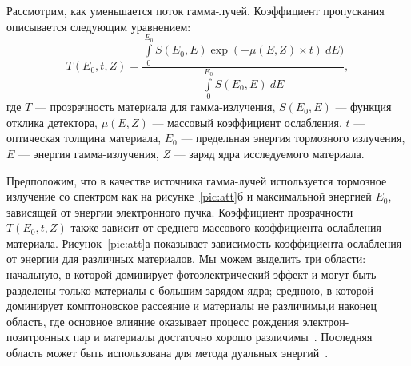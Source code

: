 \documentclass[a4paper]{panl}
\begin{document}
Рассмотрим, как уменьшается поток гамма-лучей. Коэффициент пропускания описывается следующим уравнением:
\begin{equation}
\label{eq:trans}
T(E_0, t, Z) = \frac{\int \limits_0^{E_0} S(E_0, E) \exp(-\mu(E,Z)\times t)~dE)}{\int \limits_0^{E_0} S(E_0, E)~dE},
\end{equation}
где $T$ --- прозрачность материала для гамма-излучения, $S(E_0, E)$ --- функция отклика детектора, $\mu(E,Z)$ --- массовый коэффициент ослабления, $t$ ---  оптическая толщина материала, $E_0$ --- предельная энергия тормозного излучения, $E$ --- энергия гамма-излучения, $Z$ --- заряд ядра исследуемого материала.

Предположим, что в качестве источника гамма-лучей используется тормозное излучение со спектром как на рисунке~\ref{pic:att}б и максимальной энергией $E_0$, зависящей от энергии электронного пучка. Коэффициент прозрачности  $T(E_0, t, Z)$ также зависит от среднего массового коэффициента ослабления материала. Рисунок~\ref{pic:att}а показывает зависимость коэффициента ослабления от энергии для различных материалов. Мы можем выделить три области: начальную, в которой доминирует фотоэлектрический эффект и могут быть разделены только материалы с большим зарядом ядра; среднюю, в которой доминирует комптоновское рассеяние и материалы не различимы,и наконец область, где основное влияние оказывает процесс рождения электрон-позитронных пар и материалы достаточно хорошо различимы~\cite{heitler1984quantum, ALLISON2016186, spirin}. Последняя область может быть использована для метода дуальных энергий~\cite{spirin}.
\end{document}
